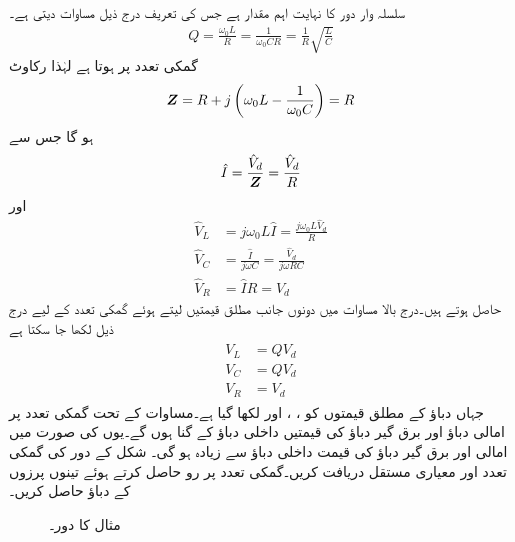 سلسلہ وار  دور کا   نہایت اہم مقدار ہے جس کی تعریف درج ذیل مساوات دیتی ہے۔
\begin{align}\label{مساوات_تعددی_معیاری_مستقل_تعریف}
Q=\frac{\omega_0 L}{R}=\frac{1}{\omega_0 CR}=\frac{1}{R}\sqrt{\frac{L}{C}}
\end{align}
گمکی تعدد پر  ہوتا ہے لہٰذا رکاوٹ
\begin{align*}
{\ensuremath{{\boldsymbol{Z}}}}=R+j\left(\omega_0 L-\frac{1}{\omega_0 C}\right)=R
\end{align*}
ہو گا جس سے 
\begin{align*}
\hat{I}=\frac{\hat{V}_d}{{{\boldsymbol{Z}}}}=\frac{\hat{V}_d}{R}
\end{align*}
اور
\begin{align*}
\hat{V}_L&=j\omega_0 L \hat{I}=\frac{j\omega_0 L \hat{V}_d}{R}\\
\hat{V}_C&=\frac{\hat{I}}{j\omega C}=\frac{\hat{V}_d}{j\omega R C}\\
\hat{V}_R&=\hat{I} R=\hat{V}_d
\end{align*}
حاصل ہوتے ہیں۔درج بالا مساوات میں دونوں جانب مطلق قیمتیں لیتے ہوئے گمکی تعدد کے لیے درج ذیل لکھا جا سکتا ہے
\begin{gather}
\begin{aligned}\label{مساوات_تعددی_گمکی_دباو_تعلقات}
V_L&=Q V_d\\
V_C&=Q V_d\\
V_R&=V_d
\end{aligned}
\end{gather}
 جہاں دباؤ کے مطلق قیمتوں کو ، ،   اور  لکھا گیا ہے۔مساوات  کے تحت گمکی تعدد پر امالی دباؤ اور برق گیر دباؤ کی قیمتیں داخلی دباؤ کے  گنا ہوں گے۔یوں  کی صورت میں امالی اور برق گیر دباؤ کی قیمت داخلی دباؤ سے زیادہ ہو گی۔ 
شکل  کے دور کی گمکی تعدد اور معیاری مستقل دریافت کریں۔گمکی تعدد پر رو حاصل کرتے ہوئے تینوں پرزوں کے دباؤ حاصل کریں۔
\begin{figure}
\centering
{}
\caption{مثال  کا دور۔}
\label{شکل_تعددی_سلسلہ_وار_گمکی_تعدد_الف}
\end{figure}

